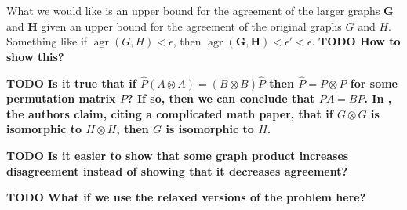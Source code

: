\documentclass{article}
\newcommand{\todo}[1]{\textbf{TODO #1}}
\newcommand{\1}{\mathbf{1}}
\DeclareMathOperator{\agr}{agr}
\begin{document}
What we would like is an upper bound for the agreement of the larger graphs $\mathbf{G}$ and $\mathbf{H}$ given an upper bound for the agreement of the original graphs $G$ and $H$.
Something like if $\agr(G, H) < \epsilon$, then $\agr(\mathbf{G}, \mathbf{H}) < \epsilon' < \epsilon$.
\todo{How to show this?}

\todo{
  Is it true that if $\hat{P}(A \otimes A) = (B \otimes B)\hat{P}$ then $\hat{P} = P \otimes P$ for some permutation matrix $P$?
  If so, then we can conclude that $PA = BP$.
  In \autocite{owwz14}, the authors claim, citing a complicated \oldstylenums{1971} math paper, that if $G \otimes G$ is isomorphic to $H \otimes H$, then $G$ is isomorphic to $H$.
}

\todo{Is it easier to show that some graph product increases disagreement instead of showing that it decreases agreement?}

\todo{What if we use the relaxed versions of the problem here?}

\printbibliography
\end{document}
